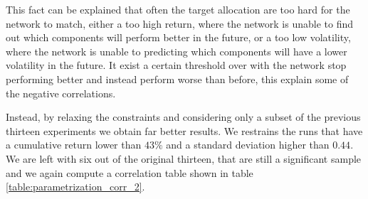 This fact can be explained that often the target allocation are too hard for the network to match, either a too high return, where the network is unable to find out which components will perform better in the future, or a too low volatility, where the network is unable to predicting which components will have a lower volatility in the future. It exist a certain threshold over with the network stop performing better and instead perform worse than before, this explain some of the negative correlations.

\hfill \break

Instead, by relaxing the constraints and considering only a subset of the previous thirteen experiments we obtain far better results. We restrains the runs that have a cumulative return lower than $43\%$ and a standard deviation higher than $0.44$. We are left with six out of the original thirteen, that are still a significant sample and we again compute a correlation table shown in table \ref{table:parametrization_corr_2}.

